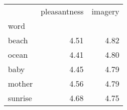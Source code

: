 \begin{tabular}{lrr}
\toprule
{} &  pleasantness &  imagery \\
word    &               &          \\
\midrule
beach   &          4.51 &     4.82 \\
ocean   &          4.41 &     4.80 \\
baby    &          4.45 &     4.79 \\
mother  &          4.56 &     4.79 \\
sunrise &          4.68 &     4.75 \\
\bottomrule
\end{tabular}
